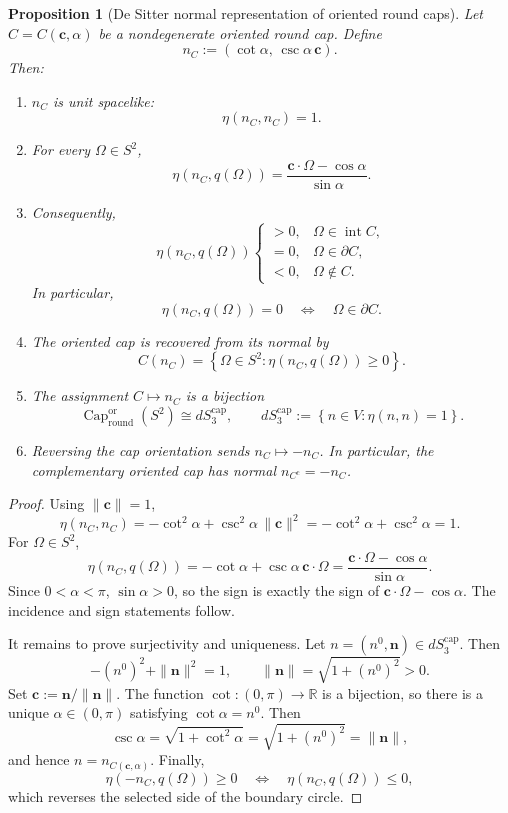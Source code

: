 \documentclass[11pt]{article}
\newtheorem{proposition}[theorem]{Proposition}
\begin{document}
\begin{proposition}[De Sitter normal representation of oriented round caps]
\label{prop:round-cap-normal}
Let \(C=C(\mathbf c,\alpha)\) be a nondegenerate oriented round cap. Define
\[
\boxed{
n_C:=\left(\cot\alpha,\,\csc\alpha\,\mathbf c\right).
}
\]
Then:
\begin{enumerate}[leftmargin=2em]
\item \(n_C\) is unit spacelike:
\[
\eta(n_C,n_C)=1.
\]
\item For every \(\Omega\in S^2\),
\[
\boxed{
\eta(n_C,q(\Omega))=
\frac{\mathbf c\cdot\Omega-\cos\alpha}{\sin\alpha}.
}
\]
\item Consequently,
\[
\eta(n_C,q(\Omega))
\begin{cases}
>0,&\Omega\in\operatorname{int}C,\\
=0,&\Omega\in\partial C,\\
<0,&\Omega\notin C.
\end{cases}
\]
In particular,
\[
\eta(n_C,q(\Omega))=0
\quad\Longleftrightarrow\quad
\Omega\in\partial C.
\]
\item The oriented cap is recovered from its normal by
\[
C(n_C)=\left\{\Omega\in S^2:\eta(n_C,q(\Omega))\geq0\right\}.
\]
\item The assignment \(C\mapsto n_C\) is a bijection
\[
\operatorname{Cap}^{\mathrm{or}}_{\mathrm{round}}(S^2)
\cong
dS_3^{\mathrm{cap}},
\qquad
dS_3^{\mathrm{cap}}:=
\left\{n\in V:\eta(n,n)=1\right\}.
\]
\item Reversing the cap orientation sends \(n_C\mapsto -n_C\). In particular,
the complementary oriented cap has normal \(n_{C^{\mathrm c}}=-n_C\).
\end{enumerate}
\end{proposition}

\begin{proof}
Using \(\|\mathbf c\|=1\),
\[
\eta(n_C,n_C)
=-\cot^2\alpha+\csc^2\alpha\,\|\mathbf c\|^2
=-\cot^2\alpha+\csc^2\alpha
=1.
\]
For \(\Omega\in S^2\),
\[
\eta(n_C,q(\Omega))
=-\cot\alpha+\csc\alpha\,\mathbf c\cdot\Omega
=\frac{\mathbf c\cdot\Omega-\cos\alpha}{\sin\alpha}.
\]
Since \(0<\alpha<\pi\), \(\sin\alpha>0\), so the sign is exactly the sign of
\(\mathbf c\cdot\Omega-\cos\alpha\). The incidence and sign statements follow.

It remains to prove surjectivity and uniqueness. Let \(n=(n^0,\mathbf n)\in
dS_3^{\mathrm{cap}}\). Then
\[
-\left(n^0\right)^2+\|\mathbf n\|^2=1,
\qquad
\|\mathbf n\|=\sqrt{1+\left(n^0\right)^2}>0.
\]
Set \(\mathbf c:=\mathbf n/\|\mathbf n\|\). The function
\(\cot:(0,\pi)\to\mathbb R\) is a bijection, so there is a unique
\(\alpha\in(0,\pi)\) satisfying \(\cot\alpha=n^0\). Then
\[
\csc\alpha=\sqrt{1+\cot^2\alpha}
=\sqrt{1+\left(n^0\right)^2}
=\|\mathbf n\|,
\]
and hence \(n=n_{C(\mathbf c,\alpha)}\). Finally,
\[
\eta(-n_C,q(\Omega))\geq0
\quad\Longleftrightarrow\quad
\eta(n_C,q(\Omega))\leq0,
\]
which reverses the selected side of the boundary circle.
\end{proof}
\end{document}
